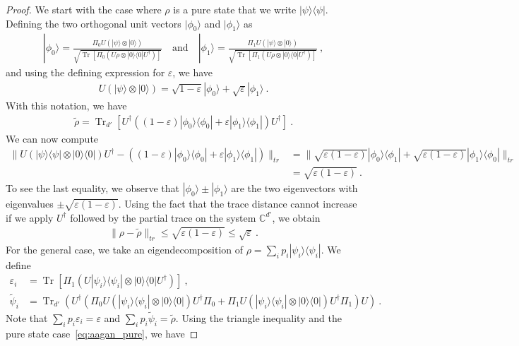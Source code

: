 \documentclass[11pt]{report}
\theoremstyle{plain}
\theoremstyle{definition}
\newcommand{\C}{{\mathbb C}}
\newcommand{\eps}{\varepsilon}
\renewcommand{\ket}[1]{|#1\rangle}
\newcommand{\ketbra}[2]{|#1\rangle\!\langle#2|}
\newcommand{\proj}[1]{\ketbra{#1}{#1}}
\newcommand{\Tr}{\operatorname{Tr}}
\begin{document}
\begin{proof}
We start with the case where $\rho$ is a pure state that we write $\proj{\psi}$.
Defining the two orthogonal unit vectors $\ket{\phi_0}$ and $\ket{\phi_1}$ as
\begin{align*}
\ket{\phi_0} = \frac{\Pi_{0} U (\ket{\psi} \otimes \ket{0})}{\sqrt{\Tr[\Pi_0 (U \rho \otimes \proj{0} U^{\dagger})]}} \quad \text{and} \quad \ket{\phi_1} = \frac{\Pi_{1} U (\ket{\psi} \otimes \ket{0})}{\sqrt{\Tr[\Pi_1 (U \rho \otimes \proj{0} U^{\dagger})]}} \ ,
\end{align*}
and using the defining expression for $\eps$, we have
\begin{align*}
U (\ket{\psi} \otimes \ket{0}) = \sqrt{1-\eps} \ket{\phi_0} + \sqrt{\eps} \ket{\phi_1} \ .
\end{align*}
With this notation, we have
\begin{align*}
\tilde{\rho} = \Tr_{d'}\left[ U^{\dagger} \left( (1-\eps) \proj{\phi_0} + \eps \proj{\phi_1} \right) U^{\dagger} \right] \ .
\end{align*}
We can now compute
\begin{align*}
\| U (\proj{\psi} \otimes \proj{0}) U^{\dagger} - \left((1-\eps) \proj{\phi_0} + \eps \proj{\phi_1} \right) \|_{tr} &= \| \sqrt{\eps (1-\eps)} \ketbra{\phi_0}{\phi_1} + \sqrt{\eps(1-\eps)} \ketbra{\phi_1}{\phi_0} \|_{tr} \\
&= \sqrt{\eps(1-\eps)} \ .
\end{align*}
To see the last equality, we observe that $\ket{\phi_0} \pm \ket{\phi_1}$ are the two eigenvectors with eigenvalues $\pm \sqrt{\eps(1-\eps)}$.
Using the fact that the trace distance cannot increase if we apply $U^{\dagger}$ followed by the partial trace on the system $\C^{d'}$,  we obtain
\begin{align}
\label{eq:aagan_pure}
\| \rho - \tilde{\rho} \|_{tr} \leq \sqrt{\eps(1-\eps)} \leq \sqrt{\eps} \ .
\end{align}
For the general case, we take an eigendecomposition of $\rho = \sum_i p_i \proj{\psi_i}$. We define
\begin{align*}
\eps_i &= \Tr[\Pi_1 (U \proj{\psi_i} \otimes \proj{0} U^{\dagger})] \ , \\
 \tilde{\psi}_i &= \Tr_{d'}\left(U^{\dagger} \left( \Pi_0 U (\proj{\psi_i} \otimes \proj{0}) U^{\dagger} \Pi_0  +  \Pi_1 U (\proj{\psi_i} \otimes \proj{0}) U^{\dagger} \Pi_1 \right) U \right) \ .
\end{align*}
 Note that $\sum_i p_i \eps_i = \eps$ and $\sum_{i} p_i \tilde{\psi}_i = \tilde{\rho}$. Using the triangle inequality and the pure state case~\eqref{eq:aagan_pure}, we have

\end{proof}
\end{document}
